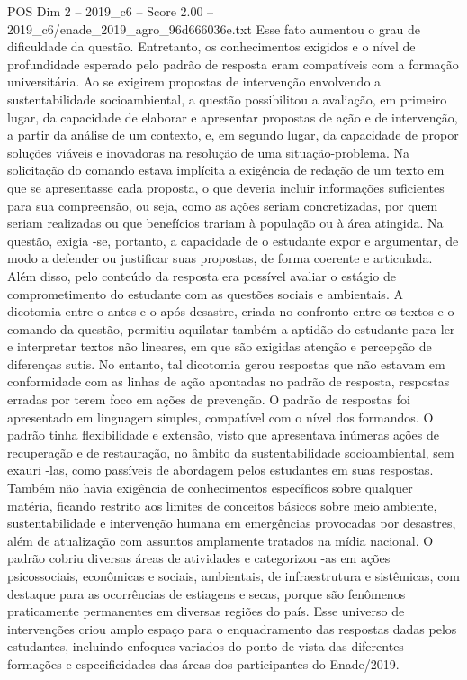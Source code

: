 \begin{textsample}{POS Dim 2 – 2019\_c6 – Score 2.00 – 2019\_c6/enade\_2019\_agro\_96d666036e.txt}
Esse fato aumentou o grau de dificuldade da questão.
Entretanto, os conhecimentos exigidos e o nível de profundidade esperado pelo padrão de resposta eram compatíveis com a formação universitária.
Ao se exigirem propostas de intervenção envolvendo a sustentabilidade socioambiental, a questão possibilitou a avaliação, em primeiro lugar, da capacidade de elaborar e apresentar propostas de ação e de intervenção, a partir da análise de um contexto, e, em segundo lugar, da capacidade de propor soluções viáveis e inovadoras na resolução de uma situação-problema.
Na solicitação do comando estava implícita a exigência de redação de um texto em que se apresentasse cada proposta, o que deveria incluir informações suficientes para sua compreensão, ou seja, como as ações seriam concretizadas, por quem seriam realizadas ou que benefícios trariam à população ou à área atingida.
Na questão, exigia -se, portanto, a capacidade de o estudante expor e argumentar, de modo a defender ou justificar suas propostas, de forma coerente e articulada.
Além disso, pelo conteúdo da resposta era possível avaliar o estágio de comprometimento do estudante com as questões sociais e ambientais.
A dicotomia entre o antes e o após desastre, criada no confronto entre os textos e o comando da questão, permitiu aquilatar também a aptidão do estudante para ler e interpretar textos não lineares, em que são exigidas atenção e percepção de diferenças sutis.
No entanto, tal dicotomia gerou respostas que não estavam em conformidade com as linhas de ação apontadas no padrão de resposta, respostas erradas por terem foco em ações de prevenção.
O padrão de respostas foi apresentado em linguagem simples, compatível com o nível dos formandos.
O padrão tinha flexibilidade e extensão, visto que apresentava inúmeras ações de recuperação e de restauração, no âmbito da sustentabilidade socioambiental, sem exauri -las, como passíveis de abordagem pelos estudantes em suas respostas.
Também não havia exigência de conhecimentos específicos sobre qualquer matéria, ficando restrito aos limites de conceitos básicos sobre meio ambiente, sustentabilidade e intervenção humana em emergências provocadas por desastres, além de atualização com assuntos amplamente tratados na mídia nacional.
O padrão cobriu diversas áreas de atividades e categorizou -as em ações psicossociais, econômicas e sociais, ambientais, de infraestrutura e sistêmicas, com destaque para as ocorrências de estiagens e secas, porque são fenômenos praticamente permanentes em diversas regiões do país.
Esse universo de intervenções criou amplo espaço para o enquadramento das respostas dadas pelos estudantes, incluindo enfoques variados do ponto de vista das diferentes formações e especificidades das áreas dos participantes do Enade/2019.

\end{textsample}
